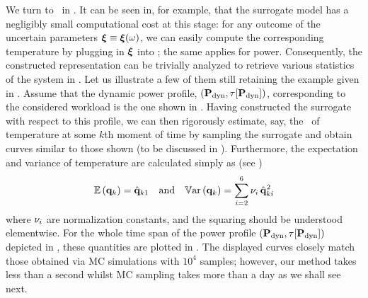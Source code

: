 We turn to \ in .
It can be seen in, for example,  that the surrogate model has a negligibly small computational cost at this stage: for any outcome of the uncertain parameters $\boldsymbol{\xi} \equiv \boldsymbol{\xi}(\omega)$, we can easily compute the corresponding temperature by plugging in $\boldsymbol{\xi}$ into ; the same applies for power.
Consequently, the constructed representation can be trivially analyzed to retrieve various statistics of the system in .
Let us illustrate a few of them still retaining the example given in .
Assume that the dynamic power profile, $\profilePdyn$, corresponding to the considered workload is the one shown in .
Having constructed the surrogate with respect to this profile, we can then rigorously estimate, say, the \pdf\ of temperature at some $k$th moment of time by sampling the surrogate and obtain curves similar to those shown  (to be discussed in ).
Furthermore, the expectation and variance of temperature are calculated simply as (see )
\[
  \mathbb{E}\left(\mathbf{q}_k\right) = \hat{\mathbf{q}}_{k1} \hspace{1em} \text{and} \hspace{1em} \mathbb{V}\text{ar}\left(\mathbf{q}_k\right) = \sum_{i = 2}^{6} \nu_i \, \hat{\mathbf{q}}_{ki}^2
\]
where $\nu_i$ are normalization constants, and the squaring should be understood elementwise.
For the whole time span of the power profile $\profilePdyn$ depicted in , these quantities are plotted in .
The displayed curves closely match those obtained via MC simulations with $10^4$ samples; however, our method takes less than a second whilst MC sampling takes more than a day as we shall see next.


